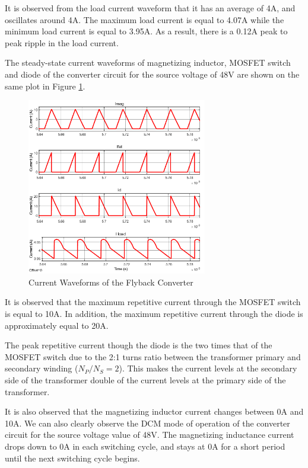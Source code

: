 It is observed from the load current waveform that it has an average of 4A, and oscillates around 4A. The maximum load current is equal to 4.07A while the minimum load current is equal to 3.95A. As a result, there is a 0.12A peak to peak ripple in the load current.

The steady-state current waveforms of magnetizing inductor, MOSFET switch and diode of the converter circuit for the source voltage of 48V are shown on the same plot in Figure \ref{fig:currents48}.

\begin{figure}[H]
\begin{center}
\includegraphics[width=0.7\textwidth]{figures/currents_48.png}
\caption{Current Waveforms of the Flyback Converter}
\label{fig:currents48}
\end{center}
\end{figure}

It is observed that the maximum repetitive current through the MOSFET switch is equal to 10A. In addition, the maximum repetitive current through the diode is approximately equal to 20A.

The peak repetitive current though the diode is the two times that of the MOSFET switch due to the 2:1 turns ratio between the transformer primary and secondary winding ($N_P/N_S = 2$). This makes the current levels at the secondary side of the transformer double of the current levels at the primary side of the transformer.

It is also observed that the magnetizing inductor current changes between 0A and 10A. We can also clearly observe the DCM mode of operation of the converter circuit for the source voltage value of 48V. The magnetizing inductance current drops down to 0A in each switching cycle, and stays at 0A for a short period until the next switching cycle begins.

